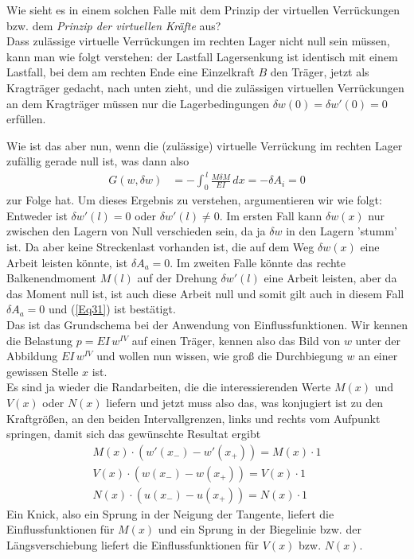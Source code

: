 Wie sieht es in einem solchen Falle mit dem Prinzip der virtuellen Verr\"{u}ckungen bzw. dem {\em Prinzip der virtuellen Kr\"{a}fte\/} aus?\\

Dass zul\"{a}ssige virtuelle Verr\"{u}ckungen im rechten Lager nicht null sein m\"{u}ssen, kann man wie folgt verstehen: der Lastfall Lagersenkung ist identisch mit einem Lastfall, bei dem am rechten Ende eine Einzelkraft $B$ den Tr\"{a}ger, jetzt als Kragtr\"{a}ger gedacht, nach unten zieht, und die zul\"{a}ssigen virtuellen Verr\"{u}ckungen an dem Kragtr\"{a}ger m\"{u}ssen nur die Lagerbedingungen $\delta w(0) = \delta w'(0) = 0$ erf\"{u}llen.

Wie ist das aber nun, wenn die (zul\"{a}ssige) virtuelle Verr\"{u}ckung im rechten Lager zuf\"{a}llig gerade null ist, was dann also
\begin{align} \label{Eq31}
G(w, \delta w) &= - \int_0^{\,l} \frac{M \delta M}{EI}\,dx = -\delta A_i = 0
\end{align}
zur Folge hat. Um dieses Ergebnis zu verstehen, argumentieren wir wie folgt: Ent\-weder ist $ \delta w'(l) = 0$ oder $ \delta w'(l) \neq 0$. Im ersten Fall kann $ \delta w(x)$ nur zwischen den Lagern von Null verschieden sein, da ja $\delta w$ in den Lagern 'stumm' ist. Da aber keine Streckenlast vorhanden ist, die auf dem Weg $\delta w(x)$ eine Arbeit leisten k\"{o}nnte, ist $\delta A_a = 0$. Im zweiten Falle k\"{o}nnte das rechte Balkenendmoment $M(l)$ auf der Drehung $\delta w'(l)$ eine Arbeit leisten, aber da das Moment null ist, ist auch diese Arbeit null und somit gilt auch in diesem Fall $\delta A_a = 0$ und (\ref{Eq31}) ist best\"{a}tigt.
\\
Das ist das Grundschema bei der Anwendung von Einflussfunktionen. Wir kennen die Belastung $p = EI\,w^{IV}$ auf einen Tr\"{a}ger, kennen also das Bild von $w$ unter der Abbildung $EI\,w^{IV}$ und wollen nun wissen, wie gro{\ss} die Durchbiegung $w$ an einer gewissen Stelle $x$ ist.\\

Es sind ja wieder die Randarbeiten, die die interessierenden Werte $M(x) $ und $V(x) $ oder $N(x) $ liefern und jetzt muss also das, was konjugiert ist zu den Kraftgr\"{o}{\ss}en, an den beiden Intervallgrenzen, links und rechts vom Aufpunkt springen, damit sich das gew\"{u}nschte Resultat ergibt
\begin{align}
M(x) \cdot (w'(x_{-}) - w'(x_+)) = M(x) \cdot 1\\
V(x) \cdot (w(x_{-}) - w(x_+)) = V(x)\cdot 1\\
N(x) \cdot (u(x_{-}) - u(x_+)) = N(x) \cdot 1
\end{align}
Ein Knick, also ein Sprung in der Neigung der Tangente, liefert die Einflussfunktionen f\"{u}r $M(x) $ und ein Sprung in der Biegelinie bzw. der L\"{a}ngsverschiebung liefert die Einflussfunktionen f\"{u}r $V(x) $ bzw. $N(x)$.

